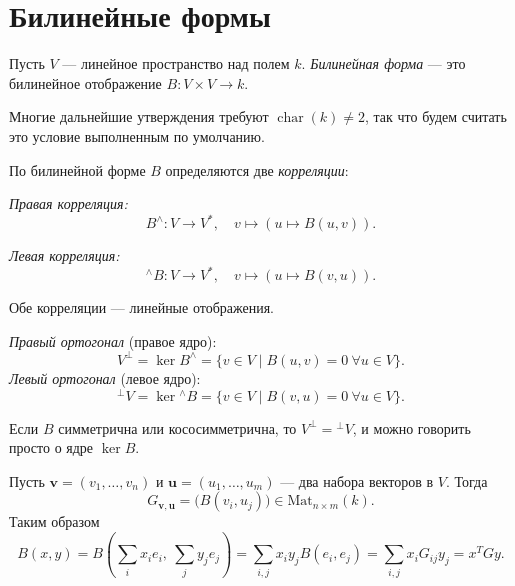 \section{Билинейные формы}

\begin{definition}
    Пусть $V$ --- линейное пространство над полем $k$.
    \emph{Билинейная форма} --- это билинейное отображение $B\colon V \times V \to k$.
\end{definition}

\begin{remark}
    Многие дальнейшие утверждения требуют $\operatorname{char}(k) \ne 2$, так что будем считать это условие выполненным по умолчанию.
\end{remark}


\begin{definition}
    По билинейной форме $B$ определяются две \emph{корреляции}:

    \emph{Правая корреляция:}
    \[
        B^{\wedge}\colon V \to V^*, \quad v \mapsto (u \mapsto B(u, v)).
    \]

    \emph{Левая корреляция:}
    \[
        {}^{\wedge}\!B\colon V \to V^*, \quad v \mapsto (u \mapsto B(v, u)).
    \]

    Обе корреляции --- линейные отображения.
\end{definition}


\begin{definition}
    \emph{Правый ортогонал} (правое ядро):
    \[
        V^\perp = \ker B^{\wedge} = \{v \in V \mid B(u, v) = 0\ \forall u \in V\}.
    \]
    \emph{Левый ортогонал} (левое ядро):
    \[
        {}^\perp V = \ker {}^{\wedge}\!B = \{v \in V \mid B(v, u) = 0\ \forall u \in V\}.
    \]
\end{definition}


\begin{remark}
    Если $B$ симметрична или кососимметрична, то $V^\perp = {}^\perp V$, и можно говорить просто о ядре $\ker B$.
\end{remark}


\begin{definition}
    Пусть $\mathbf{v} = (v_1, \dots, v_n)$ и $\mathbf{u} = (u_1, \dots, u_m)$ --- два набора векторов в
    $V$. Тогда
    \[
        G_{\mathbf{v}, \mathbf{u}} = \bigl(B(v_i, u_j)\bigr) \in \mathrm{Mat}_{n \times m}(k).
    \]
    Таким образом
    \[
        B(x, y) = B\!\left(\sum_i x_i e_i,\ \sum_j y_j e_j\right)
        = \sum_{i,j} x_i y_j B(e_i, e_j)
        = \sum_{i,j} x_i G_{ij} y_j
        = x^T G y.
    \]
\end{definition}

